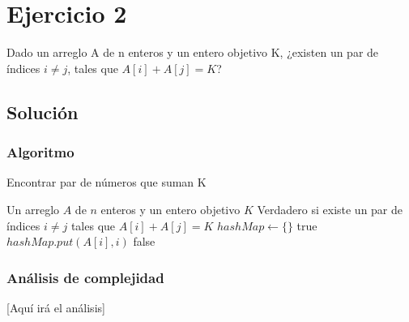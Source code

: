 \section{Ejercicio 2}
Dado un arreglo A de n enteros y un entero objetivo K, ¿existen un par de índices $i \neq j$, tales que $A[i] + A[j] = K$?

\subsection*{Solución}
\subsubsection*{Algoritmo}
\begin{algorithm}[H]
\caption{Encontrar par de números que suman K}
\begin{algorithmic}[1]
\REQUIRE Un arreglo $A$ de $n$ enteros y un entero objetivo $K$
\ENSURE Verdadero si existe un par de índices $i \neq j$ tales que $A[i] + A[j] = K$
\STATE $hashMap \gets \{\}$
        \RETURN true
    \ENDIF
    \STATE $hashMap.put(A[i], i)$
\ENDFOR
\RETURN false
\end{algorithmic}
\end{algorithm}

\subsubsection*{Análisis de complejidad}
[Aquí irá el análisis] 